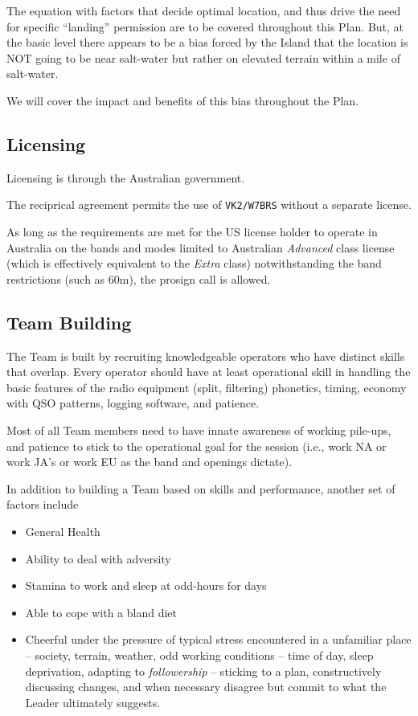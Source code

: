 \documentclass[11pt]{article}
\begin{document}
\par
The equation with factors that decide optimal location, and thus
drive the need for specific ``landing'' permission are to be covered
throughout this Plan.  But, at the basic level there appears to be
a bias forced by the Island that the location is NOT going to be near
salt-water but rather on elevated terrain within a mile of salt-water.
\par
We will cover the impact and benefits of this bias throughout the
Plan.

\subsection{Licensing}

Licensing is through the Australian government.

\par
The reciprical agreement permits the use of {\texttt{VK2/W7BRS}}
without a separate license.
\par
As long as the requirements are met for the US license holder
to operate in Australia on the bands and modes limited to
Australian {\textit{Advanced}} class license (which is effectively
equivalent to the {\textit{Extra}} class) notwithstanding the 
band restrictions (such as 60m), the prosign call is allowed.

\subsection{Team Building}
The Team is built by recruiting knowledgeable operators who have
distinct skills that overlap.   Every operator should have
at least operational skill in handling the basic features of
the radio equipment (split, filtering) phonetics, timing,
economy with QSO patterns, logging software, and patience.
\par
Most of all Team members need to have innate awareness of
working pile-ups, and patience to stick to the operational
goal for the session (i.e., work NA or work JA's or work EU
as the band and openings dictate).
\par
In addition to building a Team based on skills and performance,
another set of factors include
\begin{itemize}
\item General Health
\item Ability to deal with adversity
\item Stamina to work and sleep at odd-hours for days
\item Able to cope with a bland diet
\item Cheerful under the pressure of typical stress encountered
in a unfamiliar place -- society, terrain, weather, odd working
conditions -- time of day, sleep deprivation, adapting to 
{\textit{followership}} -- sticking to a plan, constructively 
discussing changes, and when necessary disagree but commit to what
the Leader ultimately suggests.
\end{itemize}
\end{document}
